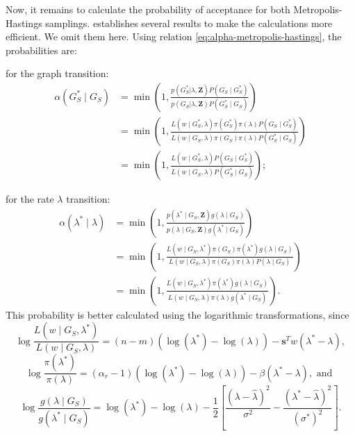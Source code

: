 Now, it remains to calculate the probability of acceptance for both
Metropolis-Hastings samplings. \textcite{crawford2016} 
establishes several results to make the calculations more efficient. We omit
them here. Using relation \eqref{eq:alpha-metropolis-hastings}, the probabilities are: 

\begin{alineas}
  \item for the graph transition:
  \begin{equation*}
    \begin{split}
      \alpha(G_S^* \mid G_S) &= \min\left(1, \frac{p (G_S^*| \lambda, \boldsymbol{Z})P(G_S \mid G_S^*)}{p (G_S | \lambda, \boldsymbol{Z}) P(G_S^* \mid G_S)}\right) \\
      &= \min\left(1, \frac{L(w \mid G_S^*, \lambda)\pi(G_S^*)\pi(\lambda)P(G_S \mid G_S^*)}{ L(w \mid G_S, \lambda)\pi(G_S)\pi(\lambda)P(G_S^* \mid G_S)}\right) \\
      &= \min\left(1, \frac{L(w \mid G_S^*, \lambda)P(G_S \mid G_S^*)}{ L(w \mid G_S, \lambda)P(G_S^* \mid G_S)}\right);
    \end{split}
  \end{equation*}
  \item for the rate $\lambda$ transition:
  \begin{equation*}
    \begin{split}
      \alpha(\lambda^* \mid \lambda) &= \min\left(1, \frac{p (\lambda^* \mid  G_S,  \boldsymbol{Z})g(\lambda \mid G_S)}{p (\lambda \mid G_S, \boldsymbol{Z}) g(\lambda^* \mid G_S)}\right) \\
      &= \min\left(1, \frac{L(w \mid G_S, \lambda^*)\pi(G_S)\pi(\lambda^*)g(\lambda \mid G_S)}{ L(w \mid G_S, \lambda)\pi(G_S)\pi(\lambda)P(\lambda \mid G_S)}\right) \\
      &= \min\left(1, \frac{L(w \mid G_S, \lambda^*)\pi(\lambda^*)g(\lambda \mid G_S)}{ L(w \mid G_S, \lambda)\pi(\lambda) g(\lambda^* \mid G_S)}\right).
    \end{split}
  \end{equation*}
  This probability is better calculated using the logarithmic transformations,
  since 
  $$
  \log \frac{L(w \mid G_S, \lambda^*)}{ L(w \mid G_S, \lambda)} = (n-m)\left(\log(\lambda^*) - \log(\lambda)\right) - \boldsymbol{s}^Tw(\lambda^* - \lambda),
  $$
  $$
  \log \frac{\pi(\lambda^*)}{\pi(\lambda)} = (\alpha_r - 1)(\log(\lambda^*) - \log(\lambda)) - \beta(\lambda^* - \lambda), \text{ and }
  $$
  $$
  \log \frac{g(\lambda \mid G_S)}{g(\lambda^* \mid G_S)} = \log(\lambda^*) - \log(\lambda) - \frac{1}{2}\left[\frac{(\lambda - \hat{\lambda})^2}{\sigma^2} - \frac{(\lambda^* - \hat{\lambda})^2}{(\sigma^*)^2}\right].
  $$
\end{alineas}


